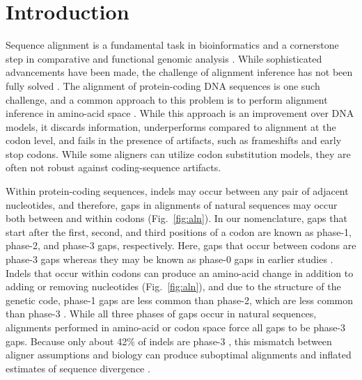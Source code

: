 \documentclass[12pt,letterpaper]{article}
\begin{document}


\section*{Introduction}

Sequence alignment is a fundamental task in bioinformatics and a cornerstone step in comparative and functional genomic analysis \citep{sequence_alignment_rosenberg_2009}. While sophisticated advancements have been made, the challenge of alignment inference has not been fully solved \citep{art_morrison_2015}.
The alignment of protein-coding DNA sequences is one such challenge, and a common approach to this problem is to perform alignment inference in amino-acid space \citep[e.g.][]{bininda2005transalign,abascal2010translatorx}. While this approach is an improvement over DNA models, it discards information, underperforms compared to alignment at the codon level, and fails in the presence of artifacts, such as frameshifts and early stop codons. While some aligners can utilize codon substitution models, they are often not robust against coding-sequence artifacts.

Within protein-coding sequences, indels may occur between any pair of adjacent nucleotides, and therefore, gaps in alignments of natural sequences may occur both between and within codons (Fig.\ \ref{fig:aln}). In our nomenclature, gaps that start after the first, second, and third positions of a codon are known as phase-1, phase-2, and phase-3 gaps, respectively. Here, gaps that occur between codons are phase-3 gaps whereas they may be known as phase-0 gaps in earlier studies \cite[e.g.][]{taylor2004occurrence}. Indels that occur within codons can produce an amino-acid change in addition to adding or removing nucleotides (Fig.\ \ref{fig:aln}), and due to the structure of the genetic code, phase-1 gaps are less common than phase-2, which are less common than phase-3 \citep{taylor2004occurrence, zhu2022profiling}. While all three phases of gaps occur in natural sequences, alignments performed in amino-acid or codon space force all gaps to be phase-3 gaps. Because only about 42\% of indels are phase-3 \citep{taylor2004occurrence, zhu2022profiling}, this mismatch between aligner assumptions and biology can produce suboptimal alignments and inflated estimates of sequence divergence
\citep[Fig.\ \ref{fig:aln};][]{redelings2007incorporating}.
\end{document}
